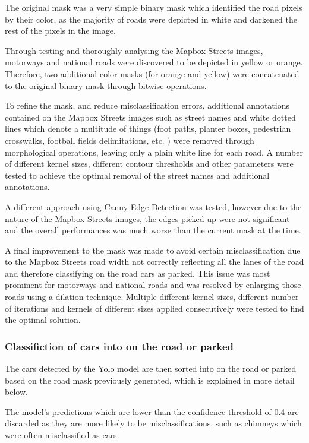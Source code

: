 The original mask was a very simple binary mask which identified the road pixels by their color, as the majority of roads were depicted in white and darkened the rest of the pixels in the image.

Through testing and thoroughly analysing the Mapbox Streets images, motorways and national roads were discovered to be depicted in yellow or orange. Therefore, two additional color masks (for orange and yellow) were concatenated to the original binary mask through bitwise operations.

To refine the mask, and reduce misclassification errors, additional annotations contained on the Mapbox Streets images such as street names and white dotted lines which denote a multitude of things (foot paths, planter boxes, pedestrian crosswalks, football fields delimitations, etc. ) were removed through morphological operations, leaving only a plain white line for each road.
A number of different kernel sizes, different contour thresholds and other parameters were tested to achieve the optimal removal of the street names and additional annotations.

A different approach using Canny Edge Detection was tested, however due to the nature of the Mapbox Streets images, the edges picked up were not significant and the overall performances was much worse than the current mask at the time.

A final improvement to the mask was made to avoid certain misclassification due to the Mapbox Streets road width not correctly reflecting all the lanes of the road and therefore classifying on the road cars as parked. This issue was most prominent for motorways and national roads and was resolved by enlarging those roads using a dilation technique. Multiple different kernel sizes, different number of iterations and kernels of different sizes applied consecutively were tested to find the optimal solution.

\subsubsection{Classifiction of cars into on the road or parked}
The cars detected by the Yolo model are then sorted into on the road or parked based on the road mask previously generated, which is explained in more detail below.

The model's predictions which are lower than the confidence threshold of 0.4 are discarded as they are more likely to be misclassifications, such as chimneys which were often misclassified as cars.

